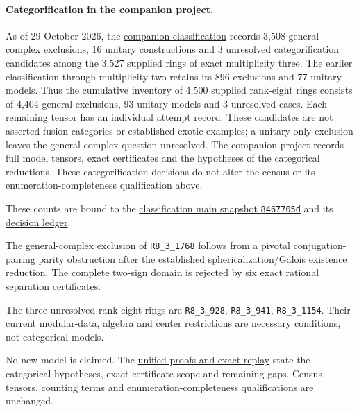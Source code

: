 \documentclass[11pt,a4paper]{article}
\theoremstyle{definition}\newtheorem{definition}[theorem]{Definition}\newtheorem{remark}[theorem]{Remark}
\begin{document}
\paragraph{Categorification in the companion project.}
As of 29 October 2026, the
\href{https://github.com/sebastienpalcoux/grothendieck-ring-classification/blob/main/docs/RESEARCH_STATUS.md}{companion classification}
records 3,508 general complex exclusions, 16 unitary constructions and 3
unresolved categorification candidates among the 3,527 supplied rings of
exact multiplicity three. The earlier classification through multiplicity
two retains its 896 exclusions and 77 unitary models. Thus the cumulative
inventory of 4,500 supplied rank-eight rings consists of 4,404 general
exclusions, 93 unitary models and 3 unresolved cases.
Each remaining tensor has an individual attempt record. These candidates
are not asserted fusion categories or established exotic examples;
a unitary-only exclusion leaves the general complex question unresolved.
The companion project records full model tensors, exact certificates and
the hypotheses of the categorical reductions. These categorification
decisions do not alter the census or its enumeration-completeness
qualification above.

These counts are bound to the \href{https://github.com/sebastienpalcoux/grothendieck-ring-classification/tree/8467705dea1bcd55c8608ee545d89cbd630c2d2b}{classification main snapshot \texttt{8467705d}} and its \href{https://github.com/sebastienpalcoux/grothendieck-ring-classification/blob/8467705dea1bcd55c8608ee545d89cbd630c2d2b/evidence/frontier/rank8_m3_ledger.json}{decision ledger}.
\par\noindent
The general-complex exclusion of \texttt{R8\_3\_1768} follows from a pivotal conjugation-pairing parity obstruction after the established sphericalization/Galois existence reduction. The complete two-sign domain is rejected by six exact rational separation certificates.

The three unresolved rank-eight rings are \texttt{R8\_3\_928}, \texttt{R8\_3\_941}, \texttt{R8\_3\_1154}. Their current modular-data, algebra and center restrictions are necessary conditions, not categorical models.

No new model is claimed. The \href{https://github.com/sebastienpalcoux/grothendieck-ring-classification/blob/main/evidence/frontier/README.md}{unified proofs and exact replay} state the categorical hypotheses, exact certificate scope and remaining gaps. Census tensors, counting terms and enumeration-completeness qualifications are unchanged.
\par
\end{document}
